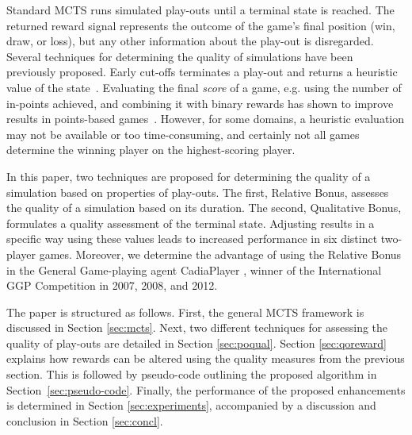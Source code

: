 \documentclass{ecai2014}
\begin{document}
Standard MCTS runs simulated play-outs until a terminal state is reached. The returned reward signal represents the outcome of the game's final position (win, draw, or loss), but any other information about the play-out is disregarded. 
Several techniques for determining the quality of simulations have been previously proposed. Early cut-offs terminates a play-out and returns a heuristic value of the state~\cite{Winands2011}. Evaluating the final \emph{score} of a game, e.g. using the number of in-points achieved, and combining it with binary rewards has shown to improve results in points-based games~\cite{shibahara2008combining}. However, for some domains, a heuristic evaluation may not be available or too time-consuming, and certainly not all games determine the winning player on the highest-scoring player.

In this paper, two techniques are proposed for determining the quality of a simulation based on properties of play-outs. The first, Relative Bonus, assesses the quality of a simulation based on its duration. The second, Qualitative Bonus, formulates a quality assessment of the terminal state. Adjusting results in a specific way using these values leads to increased performance in six distinct two-player games. Moreover, we determine the advantage of using the Relative Bonus in the General Game-playing agent {\sc CadiaPlayer} \cite{bjornsson2009cadiaplayer}, winner of the International GGP Competition in 2007, 2008, and 2012.

The paper is structured as follows. First, the general MCTS framework is discussed in Section \ref{sec:mcts}. Next, two different techniques for assessing the quality of play-outs are detailed in Section \ref{sec:poqual}. Section \ref{sec:qoreward} explains how rewards can be altered using the quality measures from the previous section. This is followed by pseudo-code outlining the proposed algorithm in Section~\ref{sec:pseudo-code}. Finally, the performance of the proposed enhancements is determined in Section \ref{sec:experiments}, accompanied by a discussion and conclusion in Section \ref{sec:concl}.

\end{document}
